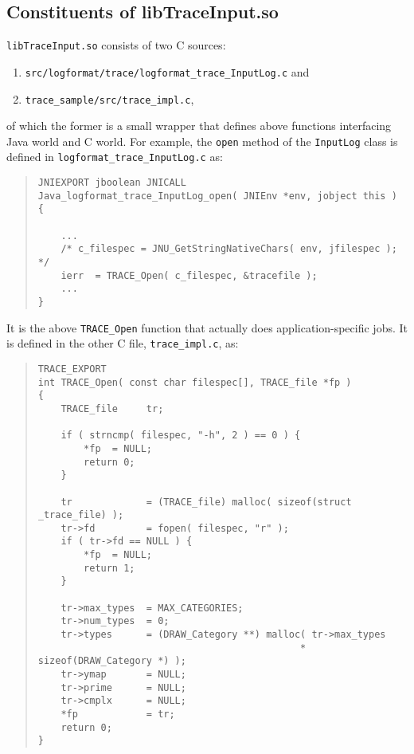 \documentclass{article}
\begin{document}
\subsection{Constituents of libTraceInput.so}
{\tt libTraceInput.so} consists of two C sources:
\begin{enumerate}
\item {\tt src/logformat/trace/logformat\_trace\_InputLog.c} and
\item {\tt trace\_sample/src/trace\_impl.c},
\end{enumerate}
of which the former is a small wrapper that defines above functions
interfacing Java world and C world.  For example, the {\tt open}
method of the {\tt InputLog} class is defined in {\tt logformat\_trace\_InputLog.c} as:

\begin{quote}
\begin{verbatim}
JNIEXPORT jboolean JNICALL
Java_logformat_trace_InputLog_open( JNIEnv *env, jobject this )
{

    ...
    /* c_filespec = JNU_GetStringNativeChars( env, jfilespec ); */
    ierr  = TRACE_Open( c_filespec, &tracefile );
    ...
}
\end{verbatim}
\end{quote}

It is the above {\tt TRACE\_Open} function that actually does application-specific jobs. 
It is defined in the other C file, {\tt trace\_impl.c}, as:

\begin{quote}
\begin{verbatim}
TRACE_EXPORT
int TRACE_Open( const char filespec[], TRACE_file *fp )
{
    TRACE_file     tr;

    if ( strncmp( filespec, "-h", 2 ) == 0 ) {
        *fp  = NULL;
        return 0;
    }

    tr             = (TRACE_file) malloc( sizeof(struct _trace_file) );
    tr->fd         = fopen( filespec, "r" );
    if ( tr->fd == NULL ) {
        *fp  = NULL;
        return 1;
    }

    tr->max_types  = MAX_CATEGORIES;
    tr->num_types  = 0;
    tr->types      = (DRAW_Category **) malloc( tr->max_types
                                              * sizeof(DRAW_Category *) );
    tr->ymap       = NULL; 
    tr->prime      = NULL;
    tr->cmplx      = NULL;
	*fp            = tr;
    return 0;
}
\end{verbatim}
\end{quote}
\end{document}
